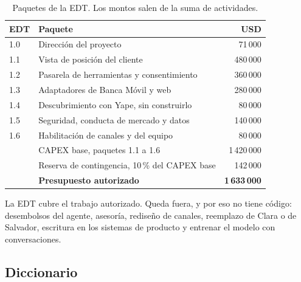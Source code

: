 \documentclass[11pt,a4paper]{article}
\begin{document}
\begin{table}[H]
\centering
\caption{Paquetes de la EDT. Los montos salen de la suma de actividades.}
\small
\begin{tabularx}{\textwidth}{@{}l X r@{}}
\toprule
\textbf{EDT} & \textbf{Paquete} & \textbf{USD} \\
\midrule
1.0 & Dirección del proyecto & 71\,000 \\
1.1 & Vista de posición del cliente & 480\,000 \\
1.2 & Pasarela de herramientas y consentimiento & 360\,000 \\
1.3 & Adaptadores de Banca Móvil y web & 280\,000 \\
1.4 & Descubrimiento con Yape, sin construirlo & 80\,000 \\
1.5 & Seguridad, conducta de mercado y datos & 140\,000 \\
1.6 & Habilitación de canales y del equipo & 80\,000 \\
\midrule
 & CAPEX base, paquetes 1.1 a 1.6 & 1\,420\,000 \\
 & Reserva de contingencia, 10\,\% del CAPEX base & 142\,000 \\
 & \textbf{Presupuesto autorizado} & \textbf{1\,633\,000} \\
\bottomrule
\end{tabularx}
\end{table}

La EDT cubre el trabajo autorizado. Queda fuera, y por eso no tiene código: desembolsos del agente, asesoría, rediseño de canales, reemplazo de Clara o de Salvador, escritura en los sistemas de producto y entrenar el modelo con conversaciones.

\subsection{Diccionario}
\end{document}
